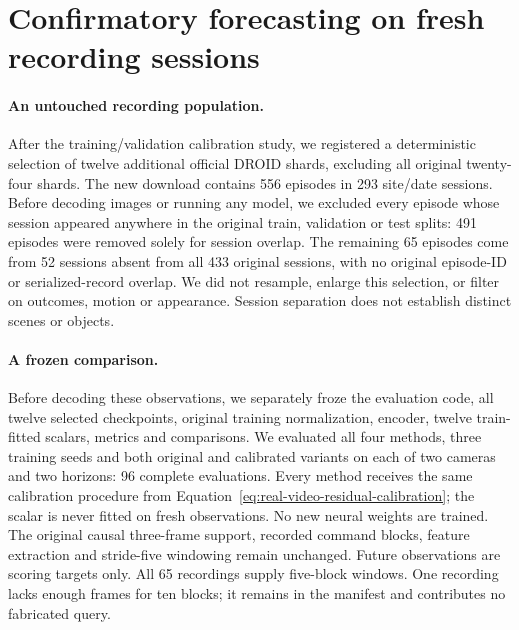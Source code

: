 \section{Confirmatory forecasting on fresh recording sessions}
\label{app:fresh-real-video}
\paragraph{An untouched recording population.}
After the training/validation calibration study, we registered a deterministic
selection of twelve additional official DROID shards, excluding all original
twenty-four shards. The new download contains 556 episodes in 293 site/date
sessions. Before decoding images or running any model, we excluded every episode
whose session appeared anywhere in the original train, validation or test splits:
491 episodes were removed solely for session overlap. The remaining 65 episodes
come from 52 sessions absent from all 433 original sessions, with no original
episode-ID or serialized-record overlap. We did not resample, enlarge this
selection, or filter on outcomes, motion or appearance. Session separation
does not establish distinct scenes or objects.

\paragraph{A frozen comparison.}
Before decoding these observations, we separately froze the evaluation code,
all twelve selected checkpoints, original training normalization, encoder,
twelve train-fitted scalars, metrics and comparisons. We evaluated all four
methods, three training seeds and both original and calibrated variants on
each of two cameras and two horizons: 96 complete evaluations. Every method
receives the same calibration procedure from
Equation~\ref{eq:real-video-residual-calibration}; the scalar is never fitted
on fresh observations. No new neural weights are trained. The original causal
three-frame support, recorded command blocks, feature extraction and stride-five
windowing remain unchanged. Future observations are scoring targets only.
All 65 recordings supply five-block windows. One recording lacks enough frames
for ten blocks; it remains in the manifest and contributes no fabricated query.

